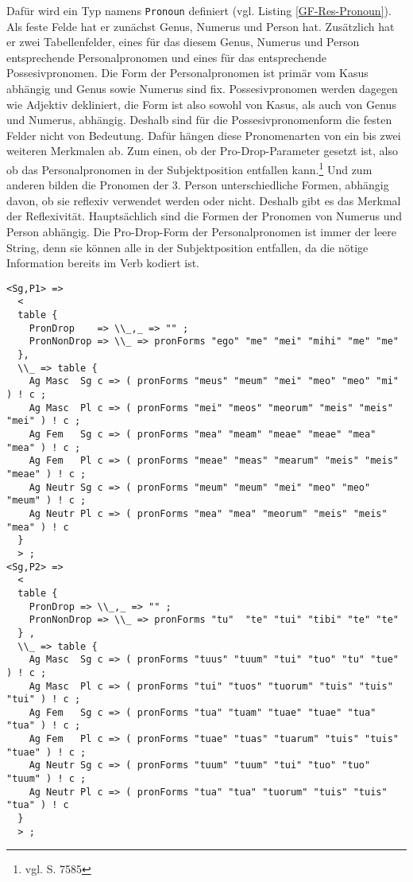 Dafür wird ein Typ namens \texttt{Pronoun} definiert (vgl. Listing \ref{GF-Res-Pronoun}). Als feste Felde hat er zunächst Genus, Numerus und Person hat. Zusätzlich hat er zwei Tabellenfelder, eines für das diesem Genus, Numerus und Person entsprechende Personalpronomen und eines für das entsprechende Possesivpronomen. Die Form der Personalpronomen ist primär vom Kasus abhängig und Genus sowie Numerus sind fix. Possesivpronomen werden dagegen wie Adjektiv dekliniert, die Form ist also sowohl von Kasus, als auch von Genus und Numerus, abhängig. Deshalb sind für die Possesivpronomenform die festen Felder nicht von Bedeutung. Dafür hängen diese Pronomenarten von ein bis zwei weiteren Merkmalen ab. Zum einen, ob der Pro-Drop-Parameter gesetzt ist, also ob das Personalpronomen in der Subjektposition entfallen kann.\footnote{vgl. \cite{METZLER2004} S. 7585} Und zum anderen bilden die Pronomen der 3. Person unterschiedliche Formen, abhängig davon, ob sie reflexiv verwendet werden oder nicht. Deshalb gibt es das Merkmal der Reflexivität. Hauptsächlich sind die Formen der Pronomen von Numerus und Person abhängig. Die Pro-Drop-Form der Personalpronomen ist immer der leere String, denn sie können alle in der Subjektposition entfallen, da die nötige Information bereits im Verb kodiert ist. \par
\begin{lstlisting}[float=h!tp,caption={Ausschnitt aus der Funktion \texttt{mkPronoun} für 1. und 2. Person Singular (vgl. \textbf{ResLat.gf})},label={GF-Res-MkPronoun-1u2Sg},basicstyle=\small]
<Sg,P1> =>
  < 
  table { 
    PronDrop    => \\_,_ => "" ;  
    PronNonDrop => \\_ => pronForms "ego" "me" "mei" "mihi" "me" "me"
  },
  \\_ => table {
    Ag Masc  Sg c => ( pronForms "meus" "meum" "mei" "meo" "meo" "mi" ) ! c ;
    Ag Masc  Pl c => ( pronForms "mei" "meos" "meorum" "meis" "meis" "mei" ) ! c ;
    Ag Fem   Sg c => ( pronForms "mea" "meam" "meae" "meae" "mea" "mea" ) ! c ;
    Ag Fem   Pl c => ( pronForms "meae" "meas" "mearum" "meis" "meis" "meae" ) ! c ;
    Ag Neutr Sg c => ( pronForms "meum" "meum" "mei" "meo" "meo" "meum" ) ! c ;
    Ag Neutr Pl c => ( pronForms "mea" "mea" "meorum" "meis" "meis" "mea" ) ! c
  }
  > ;
<Sg,P2> => 
  < 
  table {
    PronDrop => \\_,_ => "" ; 
    PronNonDrop => \\_ => pronForms "tu"  "te" "tui" "tibi" "te" "te" 
  } ,
  \\_ => table {
    Ag Masc  Sg c => ( pronForms "tuus" "tuum" "tui" "tuo" "tu" "tue" ) ! c ;
    Ag Masc  Pl c => ( pronForms "tui" "tuos" "tuorum" "tuis" "tuis" "tui" ) ! c ;
    Ag Fem   Sg c => ( pronForms "tua" "tuam" "tuae" "tuae" "tua" "tua" ) ! c ;
    Ag Fem   Pl c => ( pronForms "tuae" "tuas" "tuarum" "tuis" "tuis" "tuae" ) ! c ;
    Ag Neutr Sg c => ( pronForms "tuum" "tuum" "tui" "tuo" "tuo" "tuum" ) ! c ;
    Ag Neutr Pl c => ( pronForms "tua" "tua" "tuorum" "tuis" "tuis" "tua" ) ! c
  }
  > ;
\end{lstlisting}
